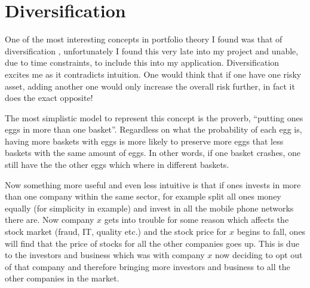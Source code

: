 \documentclass{pdfmx4020}
\begin{document}



  \section{Diversification} %
  \label{sec:diversification}
    One of the most interesting concepts in portfolio theory I found was that of diversification \cite{diversification_2}, unfortunately I found this very late into my project and unable, due to time constraints, to include this into my application. Diversification excites me as it contradicts intuition. One would think that if one have one risky asset, adding another one would only increase the overall risk further, in fact it does the exact opposite!

    The most simplistic model to represent this concept is the proverb, ``putting ones eggs in more than one basket''. Regardless on what the probability of each egg is, having more baskets with eggs is more likely to preserve more eggs that less baskets with the same amount of eggs. In other words, if one basket crashes, one still have the the other eggs which where in different baskets. 

    Now something more useful and even less intuitive is that if ones invests in more than one company within the same sector, for example split all ones money equally (for simplicity in example) and invest in all the mobile phone networks there are. Now company $x$ gets into trouble for some reason which affects the stock market (fraud, IT, quality etc.) and the stock price for $x$ begins to fall, ones will find that the price of stocks for all the other companies goes up. This is due to the investors and business which was with company $x$ now deciding to opt out of that company and therefore bringing more investors and business to all the other companies in the market. 
\end{document}
